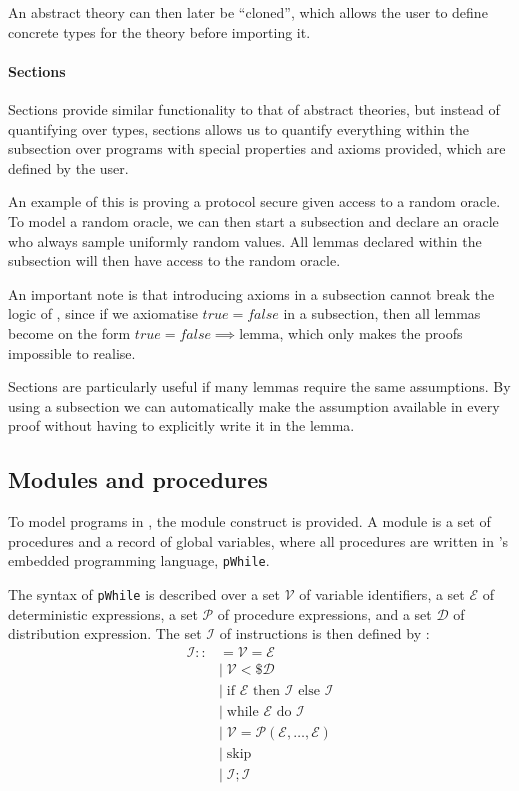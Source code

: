 An abstract theory can then later be ``cloned'', which allows the user to define
concrete types for the theory before importing it.

\paragraph{Sections}
Sections provide similar functionality to that of abstract theories, but instead of quantifying over
types, sections allows us to quantify everything within the subsection over programs
with special properties and axioms provided, which are defined by the user.

An example of this is proving a protocol secure given access to a
random oracle.
To model a random oracle, we can then start a subsection and declare an oracle who
always sample uniformly random values.
All lemmas declared within the subsection will then have access to the random
oracle.

An important note is that introducing axioms in a subsection cannot break the logic
of \easycrypt, since if we axiomatise $true = false$ in a subsection, then all
lemmas become on the form $true = false \implies \text{lemma}$, which only
makes the proofs impossible to realise.

Sections are particularly useful if many lemmas require the same assumptions. By
using a subsection we can automatically make the assumption available in every
proof without having to explicitly write it in the lemma.

\subsection{Modules and procedures}
\label{sec:ec_modules}
To model programs in \easycrypt, the module construct is provided.
A module is a set of procedures and a record of global variables, where all
procedures are written in \easycrypt's embedded programming language, \texttt{pWhile}.

The syntax of \texttt{pWhile} is described over a set $\mathcal{V}$ of variable
identifiers, a set $\mathcal{E}$ of deterministic expressions, a set
$\mathcal{P}$ of procedure expressions, and a set $\mathcal{D}$ of distribution
expression.
The set $\mathcal{I}$ of instructions is then defined
by \cite{zkcrypt}:
\begin{align*}
  \mathcal{I} ::&= \mathcal{V} = \mathcal{E} \\
              &|\; \mathcal{V} <\$ \mathcal{D} \\
              &|\; \text{if } \mathcal{E} \text{ then } \mathcal{I} \text{ else } \mathcal{I} \\
              &|\; \text{while } \mathcal{E} \text{ do } \mathcal{I} \\
              &|\; \mathcal{V} = \mathcal{P}(\mathcal{E}, \dots, \mathcal{E}) \\
              &|\; \text{skip} \\
              &|\; \mathcal{I}; \mathcal{I}
\end{align*}

